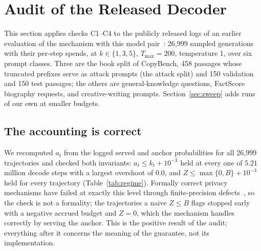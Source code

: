 \section{Audit of the Released Decoder}\label{sec:results-logs}

This section applies checks C1--C4 to the publicly released logs of an earlier evaluation of the mechanism with this model pair~\cite{vijayavallabh2026audit}: 26{,}999 sampled generations with their per-step spends, at $k \in \{1, 3, 5\}$, $T_{\max}=200$, temperature 1, over six prompt classes. Three are the book split of CopyBench, 458 passages whose truncated prefixes serve as attack prompts (the attack split) and 150 validation and 150 test passages; the others are general-knowledge questions, FactScore biography requests, and creative-writing prompts. Section~\ref{sec:sweep} adds runs of our own at smaller budgets.

\subsection{The accounting is correct}\label{sec:accounting}
We recomputed $a_t$ from the logged served and anchor probabilities for all 26{,}999 trajectories and checked both invariants: $a_t \le k_t + 10^{-3}$ held at every one of $5.21$ million decode steps with a largest overshoot of $0.0$, and $Z \le \max\{0,B\} + 10^{-3}$ held for every trajectory (Table~\ref{tab:regime}). Formally correct privacy mechanisms have failed at exactly this level through finite-precision defects~\cite{mironov2012significance,casacuberta2022widespread}, so the check is not a formality; the trajectories a naive $Z \le B$ flags stopped early with a negative accrued budget and $Z = 0$, which the mechanism handles correctly by serving the anchor. This is the positive result of the audit; everything after it concerns the meaning of the guarantee, not its implementation.

